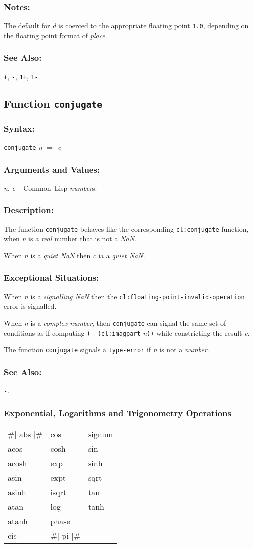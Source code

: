 \documentclass[10pt,fleqn]{article}
\newcommand{\CL}{\textsf{Common~Lisp}}
\newcommand{\code}[1]{\texttt{#1}}
\newcommand{\clieeeterm}[1]{\textit{#1}}
\newcommand{\varname}[1]{\textit{#1}}
\newcommand{\clterm}[1]{\textit{#1}}
\newcommand{\clname}[1]{\texttt{#1}}
\newcommand{\RArrow}{$\Rightarrow$}
\newcommand{\DDictionaryItem}[1]{\vspace*{6pt}\noindent\hrulefill\vspace*{-9pt}\subsection*{#1}}
\newcommand{\DSyntax}{\subsubsection*{Syntax:}}
\newcommand{\DArgsNValues}{\subsubsection*{Arguments and Values:}}
\newcommand{\DDescription}{\subsubsection*{Description:}}
\newcommand{\DExceptional}{\subsubsection*{Exceptional Situations:}}
\newcommand{\DNotes}{\subsubsection*{Notes:}}
\newcommand{\DSeeAlso}{\subsubsection*{See Also:}}
\begin{document}
\DNotes{}

The default for \varname{d} is coerced to the appropriate floating
point \code{1.0}, depending on the floating point format of
\varname{place}.

\DSeeAlso{}

\code{+}, \code{-}, \code{1+}, \code{1-}.


\DDictionaryItem{Function \code{conjugate}}

\DSyntax{}

\code{conjugate} \varname{n} \RArrow{} \varname{c}

\DArgsNValues{}

\varname{n}, \varname{c} -- \CL{} \clterm{number}s.

\DDescription{}

The function \code{conjugate} behaves like the corresponding
\code{cl:conjugate} function, when \varname{n} is a \clterm{real}
number that is not a \clieeeterm{NaN}.

\noindent
When \varname{n} is a \clieeeterm{quiet NaN} then \varname{c} ia a
\clieeeterm{quiet NaN}.

\DExceptional{}

When \varname{n} is a \clieeeterm{signalling NaN} then the
\clname{cl:floating-point-invalid-operation} error is signalled.

When \varname{n} is a \clterm{complex number}, then \code{conjugate}
can signal the same set of conditions as if computing
\code{(- (cl:imagpart} \varname{n}\code{))} while constricting the result
\varname{c}.

The function \code{conjugate} signals a \code{type-error} if
\varname{n} is not a \clterm{number}.


\DSeeAlso{}

\code{-}.






\subsubsection{Exponential, Logarithms and Trigonometry Operations}
\label{sect:transc-ops}

\begin{tt}
  \begin{tabular}{lll}
    \#| abs |\# & cos & signum\\
    acos &  cosh &  sin\\
    acosh & exp  &  sinh\\
    asin &  expt &  sqrt\\
    asinh & isqrt &  tan\\
    atan &  log &   tanh\\
    atanh & phase & \\
    cis & \#| pi |\# & \\
  \end{tabular}
\end{tt}
\end{document}
